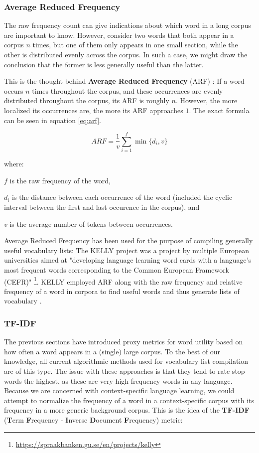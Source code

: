 \subsubsection {Average Reduced Frequency}
The raw frequency count can give indications about which word in a long corpus are important to know.
However, consider two words that both appear in a corpus $n$ times, but one of them only appears in one small section, while the other is distributed evenly across the corpus.
In such a case, we might draw the conclusion that the former is less generally useful than the latter.

This is the thought behind \textbf{Average Reduced Frequency} (ARF) \cite{savickyMeasuresWordCommonness2002}:
If a word occurs $n$ times throughout the corpus, and these occurrences are evenly distributed throughout the corpus, its ARF is roughly $n$.
However, the more localized its occurrences are, the more its ARF approaches $1$.
The exact formula can be seen in equation \ref{eq:arf}.

\begin{equation}\label{eq:arf}
	ARF = \frac{1}{v}\sum_{i=1}^{f} \min\{d_i,v\}
\end{equation}

where:

$f$ is the raw frequency of the word,

$d_i$ is the distance between each occurrence of the word (included the cyclic interval between the first and last occurence in the corpus), and

$v$ is the average number of tokens between occurrences.

Average Reduced Frequency has been used for the purpose of compiling generally useful vocabulary lists:
The KELLY project was a project by multiple European universities aimed at "developing language learning word cards with a language's most frequent words corresponding to the Common European Framework (CEFR)" \footnote{\url{https://spraakbanken.gu.se/en/projects/kelly}}.
KELLY employed ARF along with the raw frequency and relative frequency of a word in corpora to find useful words and thus generate lists of vocabulary \cite{kokkinakisCorpusbasedApproachesCreation2011}.

\subsubsection {TF-IDF}
The previous sections have introduced proxy metrics for word utility based on how often a word appears in a (single) large corpus.
To the best of our knowledge, all current algorithmic methods used for vocabulary list compilation are of this type.
The issue with these approaches is that they tend to rate stop words the highest, as these are very high frequency words in any language.
Because we are concerned with context-specific language learning, we could attempt to normalize the frequency of a word in a context-specific corpus with its frequency in a more generic background corpus.
This is the idea of the \textbf{TF-IDF} (\textbf{T}erm \textbf{F}requency - \textbf{I}nverse \textbf{D}ocument \textbf{F}requency)
\cite{qaiserTextMiningUse2018} metric:

